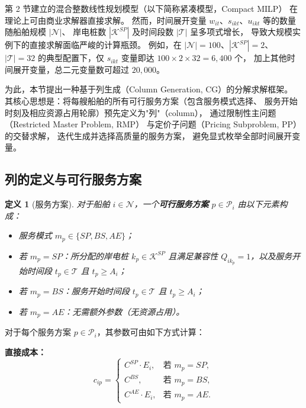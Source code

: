 \documentclass[11pt,a4paper]{article}
\newtheorem{definition}{定义}
\begin{document}
第 2 节建立的混合整数线性规划模型（以下简称紧凑模型，Compact MILP）
在理论上可由商业求解器直接求解。
然而，时间展开变量 $w_{it}$、$s_{ikt}$、$u_{ikt}$ 等的数量随船舶规模 $|\mathcal{N}|$、
岸电桩数 $|\mathcal{K}^{SP}|$ 及时间段数 $|\mathcal{T}|$ 呈多项式增长，
导致大规模实例下的直接求解面临严峻的计算瓶颈。
例如，在 $|\mathcal{N}| = 100$、$|\mathcal{K}^{SP}| = 2$、$|\mathcal{T}| = 32$
的典型配置下，仅 $s_{ikt}$ 变量即达 $100 \times 2 \times 32 = 6{,}400$ 个，
加上其他时间展开变量，总二元变量数可超过 $20{,}000$。

为此，本节提出一种基于列生成（Column Generation, CG）的分解求解框架。
其核心思想是：将每艘船舶的所有可行服务方案（包含服务模式选择、
服务开始时刻及相应资源占用轮廓）预先定义为"列"（column），
通过限制性主问题（Restricted Master Problem, RMP）
与定价子问题（Pricing Subproblem, PP）的交替求解，
迭代生成并选择高质量的服务方案，
避免显式枚举全部时间展开变量。

\subsection{列的定义与可行服务方案}

\begin{definition}[服务方案]
对于船舶 $i \in \mathcal{N}$，一个\textbf{可行服务方案} $p \in \mathcal{P}_i$
由以下元素构成：
\begin{itemize}
  \item 服务模式 $m_p \in \{SP, BS, AE\}$；
  \item 若 $m_p = SP$：所分配的岸电桩 $k_p \in \mathcal{K}^{SP}$
        且满足兼容性 $Q_{ik_p} = 1$，以及服务开始时间段 $t_p \in \mathcal{T}$
        且 $t_p \geq A_i$；
  \item 若 $m_p = BS$：服务开始时间段 $t_p \in \mathcal{T}$
        且 $t_p \geq A_i$；
  \item 若 $m_p = AE$：无需额外参数（无资源占用）。
\end{itemize}
\end{definition}

\noindent
对于每个服务方案 $p \in \mathcal{P}_i$，其参数可由如下方式计算：

\medskip
\noindent\textbf{直接成本：}
\begin{equation}
  c_{ip} =
  \begin{cases}
    C^{SP} \cdot E_i, & \text{若 } m_p = SP, \\
    C^{BS}, & \text{若 } m_p = BS, \\
    C^{AE} \cdot E_i, & \text{若 } m_p = AE.
  \end{cases}
  \tag{19}
\end{equation}
\end{document}
